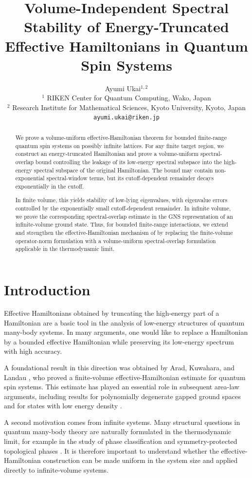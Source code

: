 \documentclass[11pt]{article}
\title{Volume-Independent Spectral Stability of Energy-Truncated Effective Hamiltonians in Quantum Spin Systems}
\author{
Ayumi Ukai$^{1,2}$\\
{\small $^1$ RIKEN Center for Quantum Computing, Wako, Japan}\\
{\small $^2$ Research Institute for Mathematical Sciences, Kyoto University, Kyoto, Japan}\\
{\small \texttt{ayumi.ukai@riken.jp}}
}
\numberwithin{equation}{section}
\begin{document}
\maketitle
\tableofcontents

\begin{abstract}
We prove a volume-uniform effective-Hamiltonian theorem for bounded finite-range quantum spin systems on possibly infinite lattices. For any finite target region, we construct an energy-truncated Hamiltonian and prove a volume-uniform spectral-overlap bound controlling the leakage of its low-energy spectral subspace into the high-energy spectral subspace of the original Hamiltonian. The bound may contain non-exponential spectral-window terms, but its cutoff-dependent remainder decays exponentially in the cutoff.

In finite volume, this yields stability of low-lying eigenvalues, with eigenvalue errors controlled by the exponentially small cutoff-dependent remainder. In infinite volume, we prove the corresponding spectral-overlap estimate in the GNS representation of an infinite-volume ground state. Thus, for bounded finite-range interactions, we extend and strengthen the effective-Hamiltonian mechanism of \cite{Arad-Kuwahara-Landau 2016} by replacing the finite-volume operator-norm formulation with a volume-uniform spectral-overlap formulation applicable in the thermodynamic limit.
\end{abstract}

\section{Introduction}
Effective Hamiltonians obtained by truncating the high-energy part of a Hamiltonian are a basic tool in the analysis of low-energy structures of quantum many-body systems. In many arguments, one would like to replace a Hamiltonian by a bounded effective Hamiltonian while preserving its low-energy spectrum with high accuracy. 

A foundational result in this direction was obtained by Arad, Kuwahara, and Landau \cite{Arad-Kuwahara-Landau 2016}, who proved a finite-volume effective-Hamiltonian estimate for quantum spin systems. This estimate has played an essential role in subsequent area-law arguments, including results for polynomially degenerate gapped ground spaces and for states with low energy density \cite{Arad-Landau-Vazirani-Vidick2017}.

A second motivation comes from infinite systems.  Many structural questions in quantum many-body theory are naturally formulated in the thermodynamic limit, for example in the study of phase classification and symmetry-protected topological phases \cite{Ogata2022}. It is therefore important to understand whether the effective-Hamiltonian construction can be made uniform in the system size and applied directly to infinite-volume systems.
\end{document}
